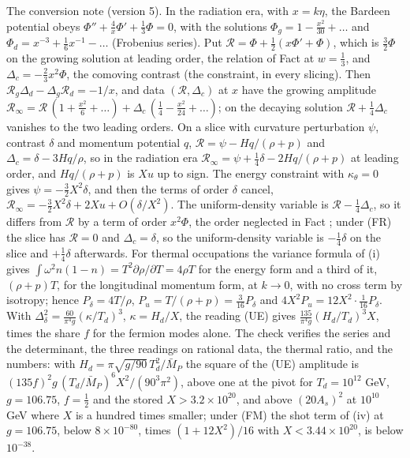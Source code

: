 The conversion note (version 5). In the radiation era, with $x = k\eta$, the Bardeen potential obeys $\Phi'' + \tfrac4x\Phi' + \tfrac13\Phi = 0$, with the solutions $\Phi_{g} = 1 - \tfrac{x^{2}}{30} + \dots$ and $\Phi_{d} = x^{-3} + \tfrac16x^{-1} - \dots$ (Frobenius series). Put $\mathcal{R} = \Phi + \tfrac12(x\Phi' + \Phi)$, which is $\tfrac32\Phi$ on the growing solution at leading order, the relation of Fact  at $w = \tfrac13$, and $\Delta_{c} = -\tfrac23x^{2}\Phi$, the comoving contrast (the constraint, in every slicing). Then $\mathcal{R}_{g}\Delta_{d} - \Delta_{g}\mathcal{R}_{d} = -1/x$, and data $(\mathcal{R}, \Delta_{c})$ at $x$ have the growing amplitude $\mathcal{R}_{\infty} = \mathcal{R}\,(1 + \tfrac{x^{2}}{6} + \dots) + \Delta_{c}\,(\tfrac14 - \tfrac{x^{2}}{24} + \dots)$; on the decaying solution $\mathcal{R} + \tfrac14\Delta_{c}$ vanishes to the two leading orders. On a slice with curvature perturbation $\psi$, contrast $\delta$ and momentum potential $q$, $\mathcal{R} = \psi - Hq/(\rho + p)$ and $\Delta_{c} = \delta - 3Hq/\rho$, so in the radiation era $\mathcal{R}_{\infty} = \psi + \tfrac14\delta - 2Hq/(\rho + p)$ at leading order, and $Hq/(\rho + p)$ is $Xu$ up to sign. The energy constraint with $\kappa_{\theta} = 0$ gives $\psi = -\tfrac32X^{2}\delta$, and then the terms of order $\delta$ cancel, $\mathcal{R}_{\infty} = -\tfrac32X^{2}\delta + 2Xu + O(\delta/X^{2})$. The uniform-density variable is $\mathcal{R} - \tfrac14\Delta_{c}$, so it differs from $\mathcal{R}$ by a term of order $x^{2}\Phi$, the order neglected in Fact ; under (FR) the slice has $\mathcal{R} = 0$ and $\Delta_{c} = \delta$, so the uniform-density variable is $-\tfrac14\delta$ on the slice and $+\tfrac14\delta$ afterwards. For thermal occupations the variance formula of (i) gives $\int\omega^{2}n(1 - n) = T^{2}\partial\rho/\partial T = 4\rho T$ for the energy form and a third of it, $(\rho + p)T$, for the longitudinal momentum form, at $k \to 0$, with no cross term by isotropy; hence $P_{\delta} = 4T/\rho$, $P_{u} = T/(\rho + p) = \tfrac{3}{16}P_{\delta}$ and $4X^{2}P_{u} = 12X^{2}\cdot\tfrac{1}{16}P_{\delta}$. With $\Delta_{\delta}^{2} = \tfrac{60}{\pi^{4}g}(\kappa/T_{d})^{3}$, $\kappa = H_{d}/X$, the reading (UE) gives $\tfrac{135}{\pi^{4}g}(H_{d}/T_{d})^{3}X$, times the share $f$ for the fermion modes alone. The check verifies the series and the determinant, the three readings on rational data, the thermal ratio, and the numbers: with $H_{d} = \pi\sqrt{g/90}\,T_{d}^{2}/\bar M_{P}$ the square of the (UE) amplitude is $(135f)^{2}g\,(T_{d}/\bar M_{P})^{6}X^{2}/(90^{3}\pi^{2})$, above one at the pivot for $T_{d} = 10^{12}$ GeV, $g = 106.75$, $f = \tfrac12$ and the stored $X > 3.2 \times 10^{20}$, and above $(20A_{s})^{2}$ at $10^{10}$ GeV where $X$ is a hundred times smaller; under (FM) the shot term of (iv) at $g = 106.75$, below $8 \times 10^{-80}$, times $(1 + 12X^{2})/16$ with $X < 3.44 \times 10^{20}$, is below $10^{-38}$.

